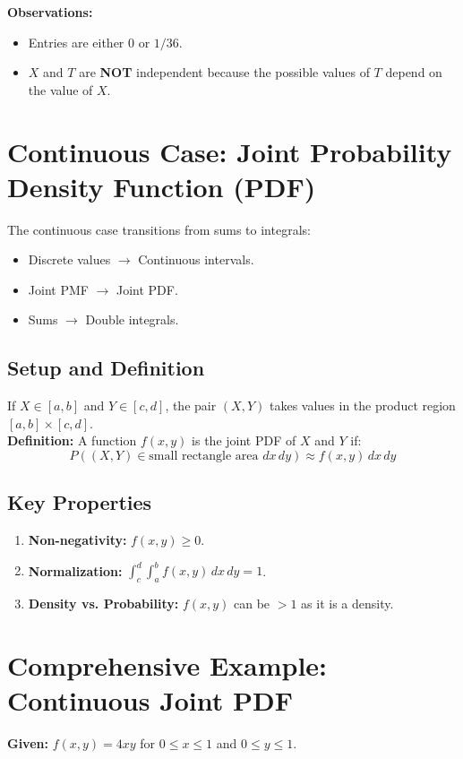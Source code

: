 \documentclass[11pt]{article}
\begin{document}
\textbf{Observations:}
\begin{itemize}
    \item Entries are either 0 or $1/36$.
    \item $X$ and $T$ are \textbf{NOT} independent because the possible values of $T$ depend on the value of $X$.
\end{itemize}

\section{Continuous Case: Joint Probability Density Function (PDF)}
The continuous case transitions from sums to integrals:
\begin{itemize}
    \item Discrete values $\rightarrow$ Continuous intervals.
    \item Joint PMF $\rightarrow$ Joint PDF.
    \item Sums $\rightarrow$ Double integrals.
\end{itemize}

\subsection*{Setup and Definition}
If $X \in [a, b]$ and $Y \in [c, d]$, the pair $(X, Y)$ takes values in the product region $[a, b] \times [c, d]$. \\
\textbf{Definition:} A function $f(x, y)$ is the joint PDF of $X$ and $Y$ if:
\[ P((X, Y) \in \text{small rectangle area } dx\,dy) \approx f(x, y)\,dx\,dy \]

\subsection*{Key Properties}
\begin{enumerate}
    \item \textbf{Non-negativity:} $f(x, y) \ge 0$.
    \item \textbf{Normalization:} $\int_{c}^{d} \int_{a}^{b} f(x, y)\,dx\,dy = 1$.
    \item \textbf{Density vs. Probability:} $f(x, y)$ can be $> 1$ as it is a density.
\end{enumerate}

\section{Comprehensive Example: Continuous Joint PDF}
\textbf{Given:} $f(x, y) = 4xy$ for $0 \le x \le 1$ and $0 \le y \le 1$.
\end{document}
